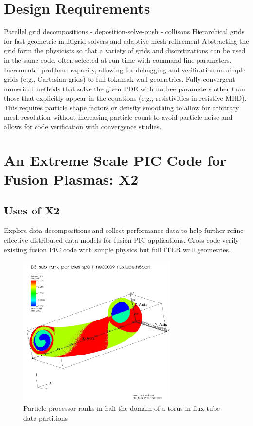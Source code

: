 \documentclass[review]{siamart}
\begin{document}
\section{Design Requirements}

Parallel grid decompositions
 - deposition-solve-push
 - collisons
 Hierarchical grids for fast geometric multigrid solvers and adaptive mesh refinement
 Abstracting the grid form the physicists so that a variety of grids and discretizations can be used in the same code, often selected at run time with command line parameters. 
 Incremental problems capacity, allowing for debugging and verification on simple grids (e.g., Cartesian grids) to full tokamak wall geometries.
 Fully convergent numerical methods that solve the given PDE with no free parameters other than those that explicitly appear in the equations (e.g., resistivities in resistive MHD).
This requires particle shape factors or density smoothing to allow for arbitrary mesh resolution without increasing particle count to avoid particle noise and allows for code verification with convergence studies.

\section{An Extreme Scale PIC Code for Fusion Plasmas: X2}

\subsection{Uses of X2}

Explore data decompositions and collect performance data to help further refine effective distributed data models for fusion PIC applications.
Cross code verify existing fusion PIC code with simple physics but full ITER wall geometries.

\begin{figure}[h!]
   \centering
   \includegraphics[width=80mm]{half_grid.jpeg} 
   \caption{Particle processor ranks in half the domain of a torus in flux tube data partitions}
   \label{fig:cross}
\end{figure}
 
\end{document}
